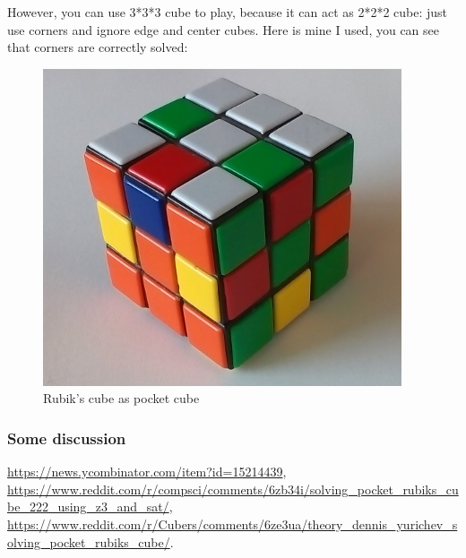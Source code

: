 However, you can use 3*3*3 cube to play, because it can act as 2*2*2 cube: just use corners and ignore
edge and center cubes.
Here is mine I used, you can see that corners are correctly solved:

\begin{figure}[H]
\centering
\includegraphics[scale=0.75]{SAT/rubik2/3solved.jpg}
\caption{Rubik's cube as pocket cube}
\end{figure}

\subsubsection{Some discussion}

\url{https://news.ycombinator.com/item?id=15214439},\\
\url{https://www.reddit.com/r/compsci/comments/6zb34i/solving_pocket_rubiks_cube_222_using_z3_and_sat/},\\
\url{https://www.reddit.com/r/Cubers/comments/6ze3ua/theory_dennis_yurichev_solving_pocket_rubiks_cube/}.

